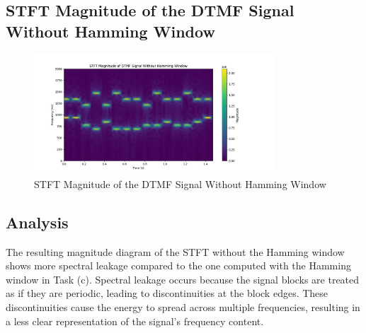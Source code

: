 \subsection*{STFT Magnitude of the DTMF Signal Without Hamming Window}
\begin{figure}[h]
    \centering
    \includegraphics[width=0.8\textwidth]{fig/ex4_d_stft_magnitude_no_hamming.png}
    \caption{STFT Magnitude of the DTMF Signal Without Hamming Window}
    \label{fig:ex4_d_stft_magnitude_no_hamming}
\end{figure}

\subsection*{Analysis}
The resulting magnitude diagram of the STFT without the Hamming window shows more spectral leakage compared to the one computed with the Hamming window in Task (c). Spectral leakage occurs because the signal blocks are treated as if they are periodic, leading to discontinuities at the block edges. These discontinuities cause the energy to spread across multiple frequencies, resulting in a less clear representation of the signal's frequency content.

